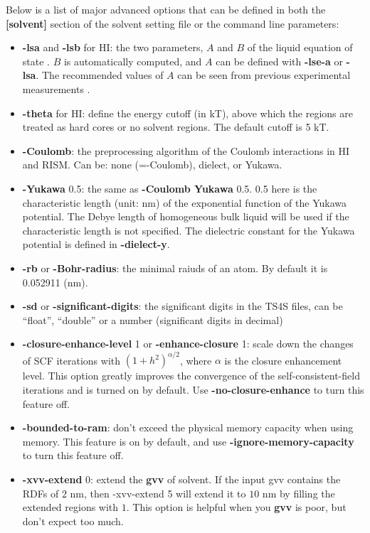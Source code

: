 \documentclass[aip,amsmath,amssymb,reprint,onecolumn]{revtex4-1}
\begin{document}
Below is a list of major advanced options that can be defined in both the {\bf[solvent]} section of the solvent setting file or the command line parameters:

\begin{itemize}
    \item {\bf -lsa} and {\bf -lsb} for HI: the two parameters, $A$ and $B$ of the liquid equation of state \cite{Cao_Xuhu_JCP_2015, Cao_Xuhu_MP_2018, Cao_Huang_AdTS_2019}. $B$ is automatically computed, and $A$ can be defined with {\bf -lse-a} or {\bf -lsa}. The recommended values of $A$ can be seen from previous experimental measurements \cite{DYMOND_IJT_1988}.
    \item {\bf -theta} for HI: define the energy cutoff (in kT), above which the regions are treated as hard cores or no solvent regions. The default cutoff is 5 kT.
    \item {\bf -Coulomb}: the preprocessing algorithm of the Coulomb interactions in HI and RISM. Can be: none (=-Coulomb), dielect, or Yukawa.
    \item {\bf -Yukawa} 0.5: the same as {\bf -Coulomb Yukawa} 0.5. 0.5 here is the characteristic length (unit: nm) of the exponential function of the Yukawa potential. The Debye length of homogeneous bulk liquid will be used if the characteristic length is not specified. The dielectric constant for the Yukawa potential is defined in {\bf -dielect-y}.
    \item {\bf -rb} or {\bf -Bohr-radius}: the minimal raiuds of an atom. By default it is 0.052911 (nm).
    \item {\bf -sd} or {\bf -significant-digits}: the significant digits in the TS4S files, can be ``float'', ``double'' or a number (significant digits in decimal)
    \item {\bf -closure-enhance-level} 1 or {\bf -enhance-closure} 1: scale down the changes of SCF iterations with $(1+h^2)^{\alpha/2}$, where $\alpha$ is the closure enhancement level. This option greatly improves the convergence of the self-consistent-field iterations and is turned on by default. Use {\bf -no-closure-enhance} to turn this feature off.
    \item {\bf -bounded-to-ram}: don't exceed the physical memory capacity when using memory. This feature is on by default, and use {\bf -ignore-memory-capacity} to turn this feature off.
    \item {\bf -xvv-extend} 0: extend the {\bf gvv} of solvent. If the input gvv contains the RDFs of $2$ nm, then -xvv-extend 5 will extend it to $10$ nm by filling the extended regions with $1$. This option is helpful when you {\bf gvv} is poor, but don't expect too much.
\end{itemize}




%
\end{document}
